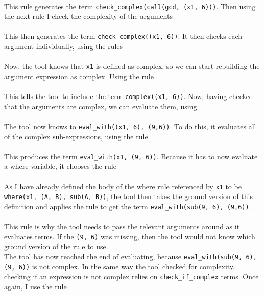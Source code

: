 
\mbox{} \\
This rule generates the term \lstinline{check_complex(call(gcd, (x1, 6)))}. Then using the next rule I check the complexity of the arguments \\ %


\mbox{} \\
This then generates the term \lstinline{check_complex((x1, 6))}. It then checks each argument individually, using the rules  \\ %


\mbox{} \\
Now, the tool knows that \lstinline{x1} is defined as complex, so we can start rebuilding the argument expression as complex. Using the rule  \\ %


\mbox{} \\
This tells the tool to include the term \lstinline{complex((x1, 6))}. Now, having checked that the arguments are complex, we can evaluate them, using \\ %


\mbox{} \\
The tool now knows to \lstinline{eval_with((x1, 6), (9,6))}. To do this, it evaluates all of the complex sub-expressions, using the rule \\ %


\mbox{} \\
This produces the term \lstinline{eval_with(x1, (9, 6))}. Because it has to now evaluate a where variable, it chooses the rule \\ %


\mbox{} \\
As I have already defined the body of the where rule referenced by \lstinline{x1} to be \lstinline{where(x1, (A, B), sub(A, B))}, the tool then takes the ground version of this definition and applies the rule to get the term \lstinline{eval_with(sub(9, 6), (9,6))}. \\ \\%
This rule is why the tool needs to pass the relevant arguments around as it evaluates terms. If the \lstinline{(9, 6)} was missing, then the tool would not know which ground version of the rule to use.\\ %
The tool has now reached the end of evaluating, because \lstinline{eval_with(sub(9, 6), (9, 6))} is not complex. In the same way the tool checked for complexity, checking if an expression is not complex relies on \lstinline{check_if_complex} terms. Once again, I use the rule\\


